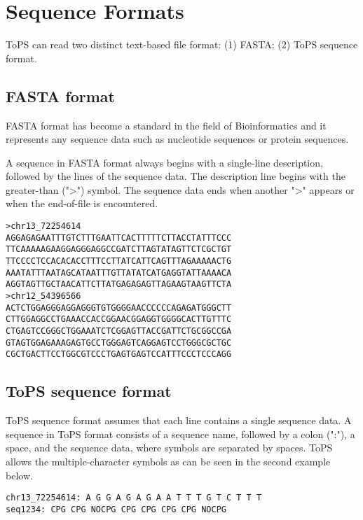 \chapter{Sequence Formats}


ToPS can read two distinct text-based file format: (1) FASTA; (2) ToPS sequence format.  

\section {FASTA format}

FASTA format has become a standard in the field of Bioinformatics and it represents any sequence data such as  nucleotide sequences or protein sequences.

A sequence in FASTA format always begins with a single-line description, followed by the lines of the sequence data.  The description line begins with the greater-than (">") symbol. The sequence data ends when another ">" appears or when the end-of-file is encountered. 

\vspace{1em}


\begin{Verbatim}
>chr13_72254614
AGGAGAGAATTTGTCTTTGAATTCACTTTTTCTTACCTATTTCCC
TTCAAAAAGAAGGAGGGAGGCCGATCTTAGTATAGTTCTCGCTGT
TTCCCCTCCACACACCTTTCCTTATCATTCAGTTTAGAAAAACTG
AAATATTTAATAGCATAATTTGTTATATCATGAGGTATTAAAACA
AGGTAGTTGCTAACATTCTTATGAGAGAGTTAGAAGTAAGTTCTA
>chr12_54396566
ACTCTGGAGGGAGGAGGGTGTGGGGAACCCCCCAGAGATGGGCTT
CTTGGAGGCCTGAAACCACCGGAACGGAGGTGGGGCACTTGTTTC
CTGAGTCCGGGCTGGAAATCTCGGAGTTACCGATTCTGCGGCCGA
GTAGTGGAGAAAGAGTGCCTGGGAGTCAGGAGTCCTGGGCGCTGC
CGCTGACTTCCTGGCGTCCCTGAGTGAGTCCATTTCCCTCCCAGG
\end{Verbatim}

\section{ToPS sequence format}

ToPS sequence format assumes that each line contains a single sequence data. 
A sequence in ToPS format consists of a sequence name, followed by a colon (":"), a space, and the sequence data, where symbols are separated by spaces.  ToPS allows the  multiple-character symbols as can be seen in the second example below.

\vspace{1em}

\begin{Verbatim}
chr13_72254614: A G G A G A G A A T T T G T C T T T
seq1234: CPG CPG NOCPG CPG CPG CPG CPG NOCPG 
\end{Verbatim}



